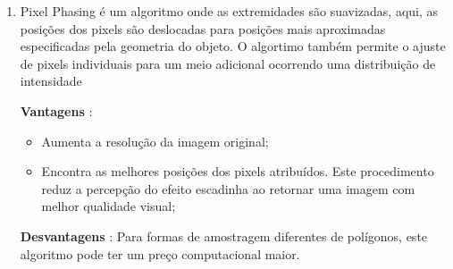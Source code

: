 \begin{enumerate}[label=\alph*.]
					\item Pixel Phasing é um algoritmo onde as extremidades são suavizadas, aqui, as posições dos pixels são deslocadas para posições mais aproximadas especificadas pela geometria do objeto. O algortimo também  permite  o  ajuste  de  pixels  individuais 
para  um meio  adicional  ocorrendo  uma  distribuição  de  intensidade
					
					\textbf{Vantagens} :  \begin{itemize}
						\item Aumenta a resolução da imagem original;
						\item Encontra  as  melhores  posições  dos  pixels  atribuídos.  Este  procedimento reduz  a percepção do efeito escadinha ao retornar uma imagem com melhor qualidade visual;
					\end{itemize}
					
					\textbf{Desvantagens} : Para formas de amostragem diferentes de polígonos, 
					este algoritmo pode ter um preço computacional maior.
									
 			  \end{enumerate}
 			  
